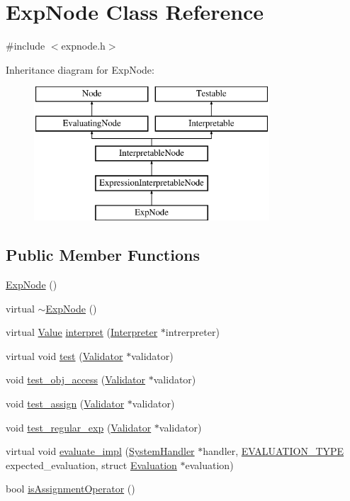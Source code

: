 \hypertarget{classExpNode}{}\section{Exp\+Node Class Reference}
\label{classExpNode}


{\ttfamily \#include $<$expnode.\+h$>$}

Inheritance diagram for Exp\+Node\+:\begin{figure}[H]
\begin{center}
\leavevmode
\includegraphics[height=5.000000cm]{classExpNode}
\end{center}
\end{figure}
\subsection*{Public Member Functions}
\begin{DoxyCompactItemize}
\item 
\hyperlink{classExpNode_a72dae84bdb441ca58d862a36912a5f67}{Exp\+Node} ()
\item 
virtual \hyperlink{classExpNode_a217540657865f605cb6847280e00bb21}{$\sim$\+Exp\+Node} ()
\item 
virtual \hyperlink{classValue}{Value} \hyperlink{classExpNode_aedff3b19b9e36a77e4558a168b81debf}{interpret} (\hyperlink{classInterpreter}{Interpreter} $\ast$intrerpreter)
\item 
virtual void \hyperlink{classExpNode_a8fb8302d5ce438a9ad0f58161be2a1c9}{test} (\hyperlink{classValidator}{Validator} $\ast$validator)
\item 
void \hyperlink{classExpNode_a84953d6f8662cdbcbe84aeb875d87939}{test\+\_\+obj\+\_\+access} (\hyperlink{classValidator}{Validator} $\ast$validator)
\item 
void \hyperlink{classExpNode_aac9d0df6bb5cae7d98a085269cf47937}{test\+\_\+assign} (\hyperlink{classValidator}{Validator} $\ast$validator)
\item 
void \hyperlink{classExpNode_ab5fbb36f2d6beebe5cd5c9a651debc57}{test\+\_\+regular\+\_\+exp} (\hyperlink{classValidator}{Validator} $\ast$validator)
\item 
virtual void \hyperlink{classExpNode_a58c05ac75051f109512ce8fa5ceb68c7}{evaluate\+\_\+impl} (\hyperlink{classSystemHandler}{System\+Handler} $\ast$handler, \hyperlink{statics_8h_a6664c451ca7787483a7981cc1de68dbb}{E\+V\+A\+L\+U\+A\+T\+I\+O\+N\+\_\+\+T\+Y\+PE} expected\+\_\+evaluation, struct \hyperlink{structEvaluation}{Evaluation} $\ast$evaluation)
\item 
bool \hyperlink{classExpNode_a39851ed23963fe02e427a7c8c4d61739}{is\+Assignment\+Operator} ()
\end{DoxyCompactItemize}
